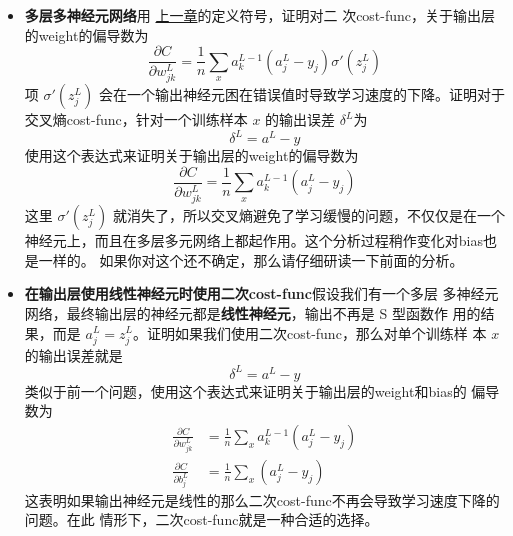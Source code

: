 \begin{itemize}
\item \textbf{多层多神经元网络}\quad 用%
  \hyperref[ch:HowTheBackpropagationAlgorithmWorks]{上一章}的定义符号，证明对二
  次\gls*{cost-func}，关于输出层的\gls*{weight}的偏导数为
  \begin{equation}
    \frac{\partial C}{\partial w^L_{jk}} = \frac{1}{n}
    \sum_x a^{L-1}_k  (a^L_j-y_j) \sigma'(z^L_j)
    \label{eq:65}\tag{65}
  \end{equation}
  项 $\sigma'(z^L_j)$ 会在一个输出神经元困在错误值时导致学习速度的下降。证明对于
  交叉熵\gls*{cost-func}，针对一个训练样本 $x$ 的输出误差 $\delta^L$为
  \begin{equation}
    \delta^L = a^L-y
    \label{eq:66}\tag{66}
  \end{equation}
  使用这个表达式来证明关于输出层的\gls*{weight}的偏导数为
  \begin{equation}
    \frac{\partial C}{\partial w^L_{jk}} = \frac{1}{n} \sum_x
    a^{L-1}_k  (a^L_j-y_j)
    \label{eq:67}\tag{67}
  \end{equation}
  这里 $\sigma'(z^L_j)$ 就消失了，所以交叉熵避免了学习缓慢的问题，不仅仅是在一个
  神经元上，而且在多层多元网络上都起作用。这个分析过程稍作变化对\gls*{bias}也是一样的。
  如果你对这个还不确定，那么请仔细研读一下前面的分析。
\item \textbf{在输出层使用线性神经元时使用二次\gls*{cost-func}}\quad 假设我们有一个多层
  多神经元网络，最终输出层的神经元都是\textbf{线性神经元}，输出不再是 S 型函数作
  用的结果，而是 $a^L_j = z^L_j$。证明如果我们使用二次\gls*{cost-func}，那么对单个训练样
  本 $x$ 的输出误差就是
  \begin{equation}
    \delta^L = a^L-y
    \label{eq:68}\tag{68}
  \end{equation}
  类似于前一个问题，使用这个表达式来证明关于输出层的\gls*{weight}和\gls*{bias}的
  偏导数为
  \begin{align}
    \frac{\partial C}{\partial w^L_{jk}} &= \frac{1}{n} \sum_x
                                           a^{L-1}_k  (a^L_j-y_j) \label{eq:69}\tag{69}\\
    \frac{\partial C}{\partial b^L_{j}} &= \frac{1}{n} \sum_x
                                          (a^L_j-y_j) \label{eq:70}\tag{70}
  \end{align}
  这表明如果输出神经元是线性的那么二次\gls*{cost-func}不再会导致学习速度下降的问题。在此
  情形下，二次\gls*{cost-func}就是一种合适的选择。
\end{itemize}

